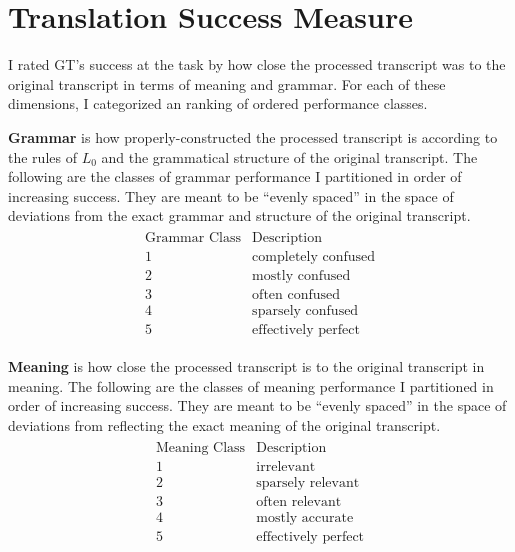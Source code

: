\documentclass{article}
\begin{document}
\section{Translation Success Measure}


I rated GT's success at the task by how close the processed transcript was to the original transcript in terms of meaning and grammar. For each of these dimensions, I categorized an ranking of ordered performance classes.




\textbf{Grammar} is how properly-constructed the processed transcript is according to the rules of $L_0$ and the grammatical structure of the original transcript.
The following are the classes of grammar performance I partitioned in order of increasing success.
They are meant to be ``evenly spaced'' in the space of deviations from the exact grammar and structure of the original transcript.
\begin{align*} \begin{array}{r|l}
\text{Grammar Class} & \text{Description} \\ \hline
1 & \text{completely confused} \\
2 & \text{mostly confused} \\
3 & \text{often confused} \\
4 & \text{sparsely confused} \\
5 & \text{effectively perfect}
\end{array} \end{align*}




\textbf{Meaning} is how close the processed transcript is to the original transcript in meaning.
The following are the classes of meaning performance I partitioned in order of increasing success.
They are meant to be ``evenly spaced'' in the space of deviations from reflecting the exact meaning of the original transcript.
\begin{align*} \begin{array}{r|l}
\text{Meaning Class} & \text{Description} \\ \hline
1 & \text{irrelevant} \\
2 & \text{sparsely relevant} \\
3 & \text{often relevant} \\
4 & \text{mostly accurate} \\
5 & \text{effectively perfect} \\
\end{array} \end{align*}
\end{document}
